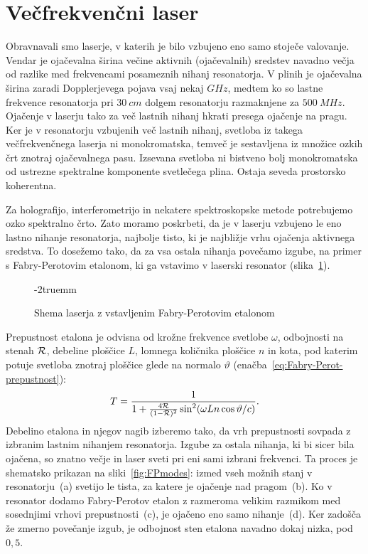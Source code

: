 \section{Večfrekvenčni laser}
\label{section:vecfrek}
Obravnavali smo laserje, v katerih je bilo vzbujeno eno samo stoječe
valovanje. Vendar je ojačevalna širina večine aktivnih (ojačevalnih) sredstev 
navadno večja od razlike med frekvencami posameznih 
nihanj resonatorja. V plinih je ojačevalna širina zaradi 
Dopplerjevega pojava vsaj nekaj $\si{GHz}$, medtem ko so lastne frekvence resonatorja 
pri $30~\si{cm}$ dolgem resonatorju razmaknjene za $500~\si{MHz}$. Ojačenje 
v laserju tako za več lastnih nihanj hkrati presega ojačenje na pragu. Ker je v 
resonatorju vzbujenih več lastnih nihanj, svetloba iz takega večfrekvenčnega laserja ni monokromatska,
temveč je sestavljena iz množice ozkih črt znotraj ojačevalnega pasu.
Izsevana svetloba ni bistveno bolj monokromatska od ustrezne spektralne 
komponente svetlečega plina. Ostaja seveda prostorsko koherentna.

Za holografijo, interferometrijo in nekatere spektroskopske metode
potrebujemo ozko spektralno črto. Zato moramo poskrbeti, da je v laserju vzbujeno le
eno lastno nihanje resonatorja, najbolje tisto, ki je najbližje vrhu ojačenja
aktivnega sredstva. To dosežemo tako, da za vsa ostala nihanja povečamo izgube,
na primer s Fabry-Perotovim etalonom, 
ki ga vstavimo v laserski resonator
(slika~\ref{fig:FPres}). 
\begin{figure}[ht]
\centering
\def\svgwidth{70truemm} 

\caption{Shema laserja z vstavljenim Fabry-Perotovim etalonom}
\label{fig:FPres}
\vglue-2truemm
\end{figure}

Prepustnost etalona je odvisna od krožne frekvence 
svetlobe $\omega$, odbojnosti na stenah 
${\cal R}$, debeline ploščice $L$, lomnega količnika ploščice $n$ in kota, pod katerim potuje
svetloba znotraj ploščice glede na normalo 
$\vartheta$ (enačba~\ref{eq:Fabry-Perot-prepustnost}):
\begin{equation}
T=\frac{1}{1+\frac{4{\cal {R}}}{(1-{\cal {R}})^{2}}\sin^{2}
(\omega L n \cos \vartheta/c)}.
\label{5.22}
\end{equation}
Debelino etalona in njegov nagib 
izberemo tako, da vrh prepustnosti sovpada z izbranim lastnim nihanjem resonatorja. 
Izgube za ostala nihanja, ki bi sicer bila ojačena, so znatno večje in laser
sveti pri eni sami izbrani frekvenci. Ta proces je shematsko prikazan na 
sliki~\ref{fig:FPmodes}: izmed vseh možnih stanj v resonatorju~(a) 
svetijo le tista, za katere
je ojačenje nad pragom~(b). 
Ko v resonator dodamo Fabry-Perotov etalon z razmeroma velikim
razmikom med sosednjimi vrhovi prepustnosti~(c), je ojačeno eno samo nihanje~(d). 
Ker zadošča že zmerno povečanje izgub, je odbojnost sten etalona navadno dokaj nizka, 
pod $0,5$. 

